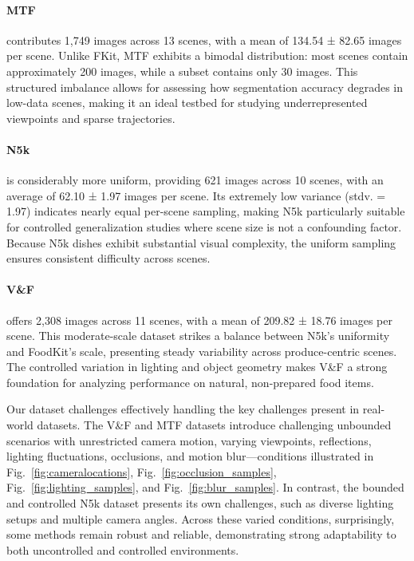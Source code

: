 \documentclass[preprint,12pt]{elsarticle}
\begin{document}
\paragraph{\textbf{MTF}} contributes 1,749 images across 13 scenes, with a mean of 134.54 ± 82.65 images per scene. Unlike FKit, MTF exhibits a bimodal distribution: most scenes contain approximately 200 images, while a subset contains only 30 images. This structured imbalance allows for assessing how segmentation accuracy degrades in low-data scenes, making it an ideal testbed for studying underrepresented viewpoints and sparse trajectories.

\paragraph{\textbf{N5k}} is considerably more uniform, providing 621 images across 10 scenes, with an average of 62.10 ± 1.97 images per scene. Its extremely low variance (stdv. = 1.97) indicates nearly equal per-scene sampling, making N5k particularly suitable for controlled generalization studies where scene size is not a confounding factor. Because N5k dishes exhibit substantial visual complexity, the uniform sampling ensures consistent difficulty across scenes.

\paragraph{\textbf{V\&F}} offers 2,308 images across 11 scenes, with a mean of 209.82 ± 18.76 images per scene. This moderate-scale dataset strikes a balance between N5k’s uniformity and FoodKit’s scale, presenting steady variability across produce-centric scenes. The controlled variation in lighting and object geometry makes V\&F a strong foundation for analyzing performance on natural, non-prepared food items.

Our dataset challenges effectively handling the key challenges present in real-world datasets. The V\&F and MTF datasets introduce challenging unbounded scenarios with unrestricted camera motion, varying viewpoints, reflections, lighting fluctuations, occlusions, and motion blur—conditions illustrated in Fig.~\ref{fig:cameralocations}, Fig.~\ref{fig:occlusion_samples}, Fig.~\ref{fig:lighting_samples},  and
Fig.~\ref{fig:blur_samples}. In contrast, the bounded and controlled N5k dataset presents its own challenges, such as diverse lighting setups and multiple camera angles. Across these varied conditions, surprisingly, some methods remain robust and reliable, demonstrating strong adaptability to both uncontrolled and controlled environments.
\end{document}
